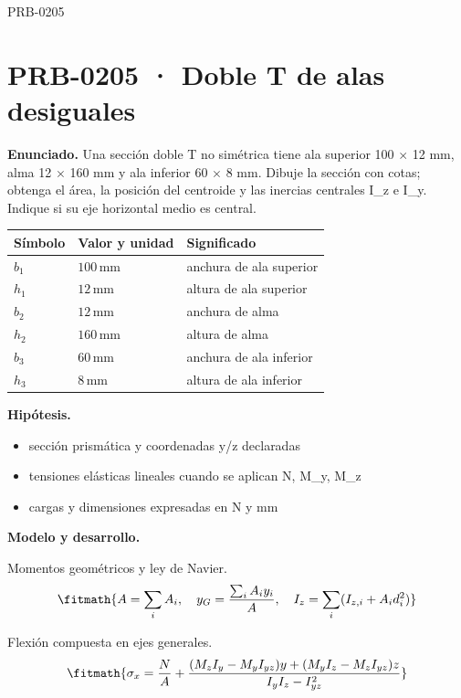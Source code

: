 \begin{studiumworked}{PRB-0205}

\section{PRB-0205 · Doble T de alas desiguales}

\textbf{Enunciado.} Una sección doble T no simétrica tiene ala superior 100 \ensuremath{\times} 12 mm, alma 12 \ensuremath{\times} 160 mm y ala inferior 60 \ensuremath{\times} 8 mm. Dibuje la sección con cotas; obtenga el área, la posición del centroide y las inercias centrales I\_z e I\_y. Indique si su eje horizontal medio es central.

\par\medskip\noindent\begin{tabular}{@{}p{.18\linewidth}p{.26\linewidth}p{.48\linewidth}@{}}
\toprule Símbolo & Valor y unidad & Significado\\\midrule
$b_{1}$ & $100\,\mathrm{mm}$ & anchura de ala superior\\
$h_{1}$ & $12\,\mathrm{mm}$ & altura de ala superior\\
$b_{2}$ & $12\,\mathrm{mm}$ & anchura de alma\\
$h_{2}$ & $160\,\mathrm{mm}$ & altura de alma\\
$b_{3}$ & $60\,\mathrm{mm}$ & anchura de ala inferior\\
$h_{3}$ & $8\,\mathrm{mm}$ & altura de ala inferior\\
\bottomrule\end{tabular}\par\medskip

\textbf{Hipótesis.}\begin{itemize}\item sección prismática y coordenadas y/z declaradas
\item tensiones elásticas lineales cuando se aplican N, M\_y, M\_z
\item cargas y dimensiones expresadas en N y mm\end{itemize}

\textbf{Modelo y desarrollo.}

Momentos geométricos y ley de Navier.\[\fitmath{A = \sum_i A_i,\quad y_G = \frac{\sum_i A_i y_i}{A},\quad I_z = \sum_i (I_{z,i}+A_i d_i^2)}\]

Flexión compuesta en ejes generales.\[\fitmath{\sigma_x = \frac{N}{A}+\frac{(M_z I_y-M_y I_{yz})y+(M_y I_z-M_z I_{yz})z}{I_y I_z-I_{yz}^{2}}}\]


\end{studiumworked}
